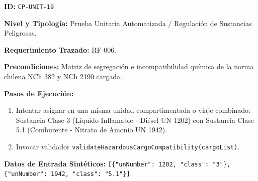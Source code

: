 \par\noindent\textbf{ID:} \texttt{C\allowbreak{}P\allowbreak{}-\allowbreak{}U\allowbreak{}N\allowbreak{}I\allowbreak{}T\allowbreak{}-\allowbreak{}1\allowbreak{}9\allowbreak{}}\par
\par\noindent\textbf{Nivel y Tipología:} Prueba Unitaria Automatizada / Regulación de Sustancias Peligrosas.\par
\par\noindent\textbf{Requerimiento Trazado:} RF-006.\par
\par\noindent\textbf{Precondiciones:} Matriz de segregación e incompatibilidad química de la norma chilena NCh 382 y NCh 2190 cargada.\par
\par\noindent\textbf{Pasos de Ejecución:} \par
\begin{enumerate}
\item Intentar asignar en una misma unidad compartimentada o viaje combinado: Sustancia Clase 3 (Líquido Inflamable - Diésel UN 1202) con Sustancia Clase 5.1 (Comburente - Nitrato de Amonio UN 1942).
\item Invocar validador \texttt{v\allowbreak{}a\allowbreak{}l\allowbreak{}i\allowbreak{}d\allowbreak{}a\allowbreak{}t\allowbreak{}e\allowbreak{}H\allowbreak{}a\allowbreak{}z\allowbreak{}a\allowbreak{}r\allowbreak{}d\allowbreak{}o\allowbreak{}u\allowbreak{}s\allowbreak{}C\allowbreak{}a\allowbreak{}r\allowbreak{}g\allowbreak{}o\allowbreak{}C\allowbreak{}o\allowbreak{}m\allowbreak{}p\allowbreak{}a\allowbreak{}t\allowbreak{}i\allowbreak{}b\allowbreak{}i\allowbreak{}l\allowbreak{}i\allowbreak{}t\allowbreak{}y\allowbreak{}(\allowbreak{}c\allowbreak{}a\allowbreak{}r\allowbreak{}g\allowbreak{}o\allowbreak{}L\allowbreak{}i\allowbreak{}s\allowbreak{}t\allowbreak{})\allowbreak{}}.
\end{enumerate}
\par\noindent\textbf{Datos de Entrada Sintéticos:} \texttt{[\allowbreak{}\{\allowbreak{}"\allowbreak{}u\allowbreak{}n\allowbreak{}N\allowbreak{}u\allowbreak{}m\allowbreak{}b\allowbreak{}e\allowbreak{}r\allowbreak{}"\allowbreak{}:\allowbreak{} 1\allowbreak{}2\allowbreak{}0\allowbreak{}2\allowbreak{},\allowbreak{} "\allowbreak{}c\allowbreak{}l\allowbreak{}a\allowbreak{}s\allowbreak{}s\allowbreak{}"\allowbreak{}:\allowbreak{} "\allowbreak{}3\allowbreak{}"\allowbreak{}\}\allowbreak{},\allowbreak{} \{\allowbreak{}"\allowbreak{}u\allowbreak{}n\allowbreak{}N\allowbreak{}u\allowbreak{}m\allowbreak{}b\allowbreak{}e\allowbreak{}r\allowbreak{}"\allowbreak{}:\allowbreak{} 1\allowbreak{}9\allowbreak{}4\allowbreak{}2\allowbreak{},\allowbreak{} "\allowbreak{}c\allowbreak{}l\allowbreak{}a\allowbreak{}s\allowbreak{}s\allowbreak{}"\allowbreak{}:\allowbreak{} "\allowbreak{}5\allowbreak{}.\allowbreak{}1\allowbreak{}"\allowbreak{}\}\allowbreak{}]\allowbreak{}}.\par
